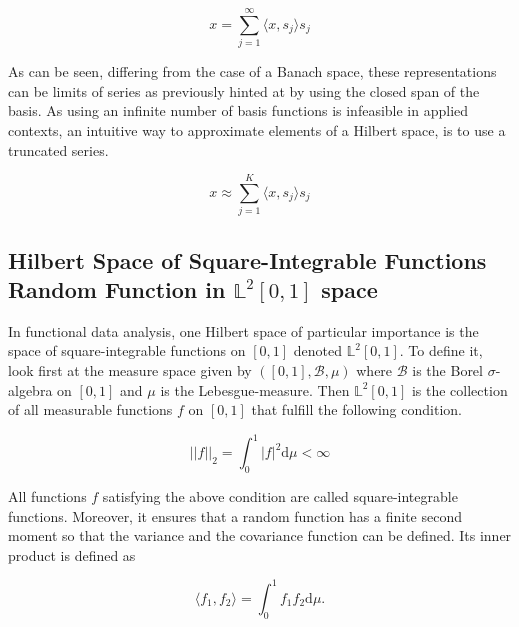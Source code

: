 \documentclass[11pt,twoside,a4paper]{article}
\begin{document}
	\begin{equation}
		x = \sum_{j = 1}^{\infty}{\langle x, s_j \rangle}s_j
	\end{equation}
	
	As can be seen, differing from the case of a Banach space, these representations can be limits of series as previously hinted at by using the closed span of the basis. As using an infinite number of basis functions is infeasible in applied contexts, an intuitive way to approximate elements of a Hilbert space, is to use a truncated series.
	
	\begin{equation}
		x \approx \sum_{j = 1}^{K}{\langle x, s_j \rangle}s_j
	\end{equation}
	
	\subsection{Hilbert Space of Square-Integrable Functions{\color{orange} Random Function in $\mathbb{L}^2[0,1]$ space}}
	In functional data analysis, one Hilbert space of particular importance is the space of square-integrable functions on $[0,1]$ denoted $\mathbb{L}^2[0,1]$. To define it, look first at the measure space given by $([0,1], \mathcal{B}, \mu)$ where $\mathcal{B}$ is the Borel $\sigma$-algebra on $[0,1]$ and $\mu$ is the Lebesgue-measure. Then $\mathbb{L}^2[0,1]$ is the collection of all measurable functions $f$ on $[0,1]$ that fulfill the following condition.
	
	\begin{equation}
		\lvert \lvert f \rvert \rvert_2 = \int_{0}^{1} \lvert f \rvert^2 \mathrm{d}\mu < \infty
	\end{equation}
	
	All functions $f$ satisfying the above condition are called square-integrable functions. Moreover, it ensures that a random function has a finite second moment so that the variance and the covariance function can be defined. Its inner product is defined as
	
	\begin{equation}
		\langle f_1, f_2 \rangle = \int_{0}^{1} f_1 f_2 \mathrm{d}\mu.
	\end{equation}
	
\end{document}
